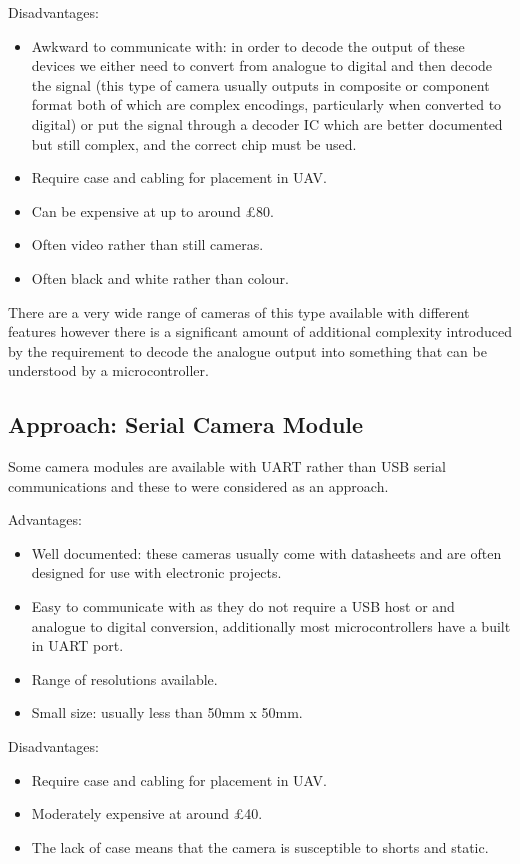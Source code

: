 Disadvantages:
     \begin{itemize}
        \item Awkward to communicate with: in order to decode the output of these devices we either need to convert from analogue to digital and then decode the signal (this type of camera usually outputs in composite or component format both of which are complex encodings, particularly when converted to digital) or put the signal through a decoder IC which are better documented but still complex, and the correct chip must be used.
        \item Require case and cabling for placement in UAV.
		\item Can be expensive at up to around \pounds 80.
		\item Often video rather than still cameras.
		\item Often black and white rather than colour.
     \end{itemize}

There are a very wide range of cameras of this type available with different features however there is a significant amount of additional complexity introduced by the requirement to decode the analogue output into something that can be understood by a microcontroller.

\subsection{Approach: Serial Camera Module}
\label{sec:Serial_option}

Some camera modules are available with UART rather than USB serial communications and these to were considered as an approach.

Advantages:
      \begin{itemize}
      	 \item Well documented: these cameras usually come with datasheets and are often designed for use with electronic projects.
		 \item Easy to communicate with as they do not require a USB host or and analogue to digital conversion, additionally most microcontrollers have a built in UART port.
         \item Range of resolutions available.
		 \item Small size: usually less than 50mm x 50mm.
		 
     \end{itemize}

Disadvantages:
     \begin{itemize}
       	\item Require case and cabling for placement in UAV.
	\item Moderately expensive at around \pounds 40.
       	\item The lack of case means that the camera is susceptible to shorts and static.
     \end{itemize}


